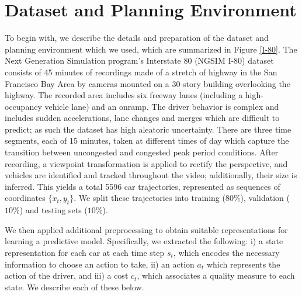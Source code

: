 \documentclass{article} %
\begin{document}
\section{Dataset and Planning Environment}
\label{i80-dataset-prep}

To begin with, we describe the details and preparation of the dataset and planning environment which we used, which are summarized in Figure \ref{I-80}.
The Next Generation Simulation program's Interstate 80 (NGSIM I-80) dataset \citep{NGSIM} consists of 45 minutes of recordings made of a stretch of highway in the San Francisco Bay Area by cameras mounted on a 30-story building overlooking the highway. The recorded area includes six freeway lanes (including a high-occupancy vehicle lane) and an onramp.
The driver behavior is complex and includes sudden accelerations, lane changes and merges which are difficult to predict; as such the dataset has high aleatoric uncertainty.
There are three time segments, each of 15 minutes, taken at different times of day which capture the transition between uncongested and congested peak period conditions.
After recording, a viewpoint transformation is applied to rectify the perspective, and vehicles are identified and tracked throughout the video; additionally, their size is inferred.
This yields a total 5596 car trajectories, represented as sequences of coordinates $\{x_t, y_t\}$. We split these trajectories into training ($80\%$), validation ($10\%$) and testing sets ($10\%$).

We then applied additional preprocessing to obtain suitable representations for learning a predictive model.
Specifically, we extracted the following: i) a state representation for each car at each time step $s_t$, which encodes the necessary information to choose an action to take, ii) an action $a_t$ which represents the action of the driver, and iii) a cost $c_t$, which associates a quality measure to each state. We describe each of these below.
\end{document}

